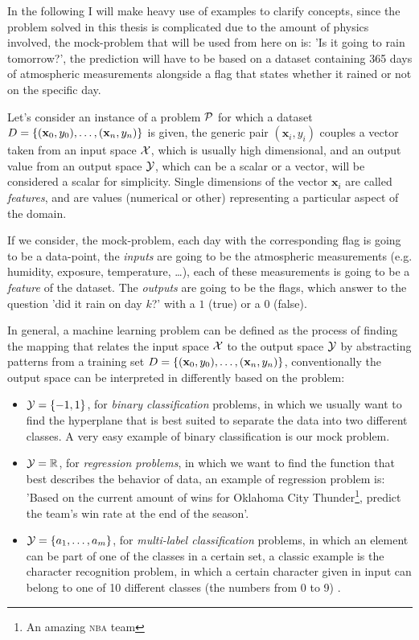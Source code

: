 \medskip

In the following I will make heavy use of examples to clarify concepts, since the problem solved in
this thesis is complicated due to the amount of physics involved, the mock-problem that will be used
from here on is: 'Is it going to rain tomorrow?', the prediction will have to be based on a dataset
containing 365 days of atmospheric measurements alongside a flag that states whether it rained or
not on the specific day.

\medskip

Let's consider an instance of a problem $\mathcal{P}$ for which a dataset $D = \{(\mathbf{x}_0, y_0), \ldots, (\mathbf{x}_n, y_n)\}$ is given, the generic
pair $(\mathbf{x}_i, y_i)$ couples a vector taken from an input space $\mathcal{X}$, which is usually high dimensional,
and an output value from an output space $\mathcal{Y}$, which can be a scalar or a vector, will be
considered a scalar for simplicity. Single dimensions of the vector $\mathbf{x}_i$ are called \emph{features}, and are values (numerical or other) representing a particular aspect of the domain.

If we consider, the mock-problem, each day with the corresponding flag is going to be a data-point,
the \emph{inputs} are going to be the atmospheric measurements (e.g. humidity, exposure,
temperature, \ldots), each of these measurements is going to be a \emph{feature} of the dataset. The
\emph{outputs} are going to be the flags, which answer to the question 'did it rain on day $k$?'
with a $1$ (true) or a $0$ (false).

\medskip

In general, a machine learning problem can be defined as the process of finding the mapping that
relates the input space $\mathcal{X}$ to the output space $\mathcal{Y}$ by abstracting patterns from
a training set $D = \{(\mathbf{x}_0, y_0), \ldots, (\mathbf{x}_n, y_n)\}$, conventionally the output space can be interpreted in differently based on
the problem:
\begin{itemize}
	\item $\mathcal{Y} = \{-1, 1\}$, for \emph{binary classification} problems, in which we
	      usually want to find the hyperplane that is best suited to separate the data into
	      two different classes. A very easy example of binary classification is our mock problem.
	\item $\mathcal{Y} = \mathbb{R}$, for \emph{regression problems}, in which we want to find the
	      function that best describes the behavior of data, an example of regression problem
	      is: 'Based on the current amount of wins for Oklahoma City Thunder\footnote{An
		      amazing \textsc{nba} team}, predict the team's win rate at the end of the season'.
	\item $\mathcal{Y} = \{a_1,\ldots, a_m\}$, for \emph{multi-label classification} problems, in
	      which an element can be part of one of the classes in a certain set, a classic
	      example is the character recognition problem, in which a certain character given in input can belong to one of 10 different classes (the numbers from 0 to 9) \cite{pal2010handwritten}.
\end{itemize}

